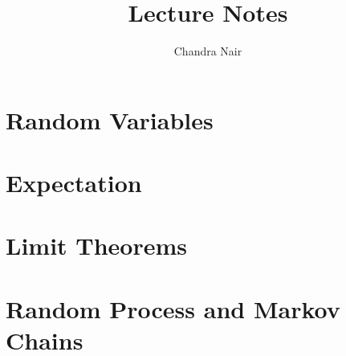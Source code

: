 \documentclass{easyclass}
\begin{document}
\begin{titlepage}
    \title{Lecture Notes}
    \author{Chandra Nair}
    \maketitle
\end{titlepage}

\tableofcontents




\chapter{Random Variables}


%
\chapter{Expectation}


\chapter{Limit Theorems}


\chapter{Random Process and Markov Chains}

\end{document}
